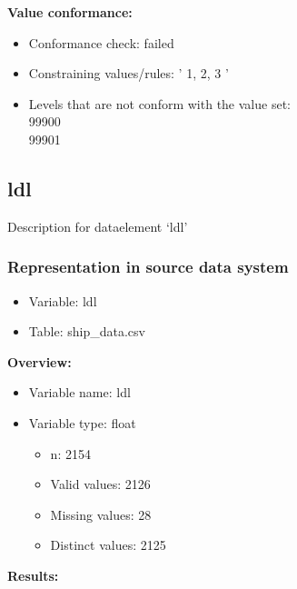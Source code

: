 \documentclass[
]{article}
\providecommand{\tightlist}{%
  \setlength{\itemsep}{0pt}\setlength{\parskip}{0pt}}
\begin{document}
\textbf{Value conformance:}

\begin{itemize}
\tightlist
\item
  Conformance check: failed
\item
  Constraining values/rules: ' 1, 2, 3 '
\item
  Levels that are not conform with the value set:\\
  99900\\
  99901
\end{itemize}

\newpage

\hypertarget{ldl}{%
\subsection{ldl}\label{ldl}}

Description for dataelement `ldl'

\hypertarget{representation-in-source-data-system-16}{%
\subsubsection{\texorpdfstring{Representation in \textbf{source} data
system}{Representation in source data system}}\label{representation-in-source-data-system-16}}

\begin{itemize}
\tightlist
\item
  Variable: ldl
\item
  Table: ship\_data.csv
\end{itemize}

\textbf{Overview:}

\begin{itemize}
\tightlist
\item
  Variable name: ldl
\item
  Variable type: float

  \begin{itemize}
  \tightlist
  \item
    n: 2154
  \item
    Valid values: 2126
  \item
    Missing values: 28
  \item
    Distinct values: 2125
  \end{itemize}
\end{itemize}

\textbf{Results:}\\
\end{document}
